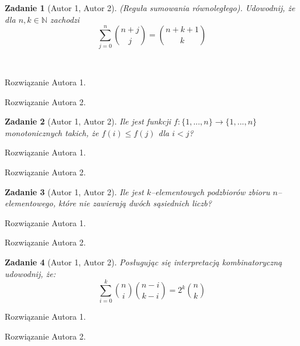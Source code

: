 \documentclass{mwart}
\newtheorem{zad}{Zadanie}[section]
\begin{document}
\begin{zad}[Autor 1, Autor 2]
    (Reguła sumowania równoległego). Udowodnij, że dla $n, k \in \mathbb{N}$
    zachodzi \[ \sum_{j= 0}^{n}\binom{n+j}{j} = \binom{n+k+1}{k}   \]
\end{zad}\
\begin{mdframed}
    Rozwiązanie Autora 1.
\end{mdframed}
\begin{mdframed}
    Rozwiązanie Autora 2.
\end{mdframed}



\begin{zad}[Autor 1, Autor 2]
    Ile jest funkcji $f:\{1, ..., n\} \to \{1, ..., n\}$ monotonicznych takich,
    że $f(i) \leq f(j) $ dla $i < j$?
\end{zad}
\begin{mdframed}
    Rozwiązanie Autora 1.
\end{mdframed}
\begin{mdframed}
    Rozwiązanie Autora 2.
\end{mdframed}




\begin{zad}[Autor 1, Autor 2]
    Ile jest $k$--elementowych podzbiorów zbioru $n$--elementowego, które nie
    zawierają dwóch sąsiednich liczb?
\end{zad}
\begin{mdframed}
    Rozwiązanie Autora 1.
\end{mdframed}
\begin{mdframed}
    Rozwiązanie Autora 2.
\end{mdframed}


\begin{zad}[Autor 1, Autor 2]
    Posługując się interpretacją kombinatoryczną udowodnij, że:
    \[ \sum_{i=0}^{k} \binom{n}{i} \binom{n-i}{k-i} = 2^k \binom{n}{k} \]
\end{zad}
\begin{mdframed}
    Rozwiązanie Autora 1.
\end{mdframed}
\begin{mdframed}
    Rozwiązanie Autora 2.
\end{mdframed}
\end{document}
